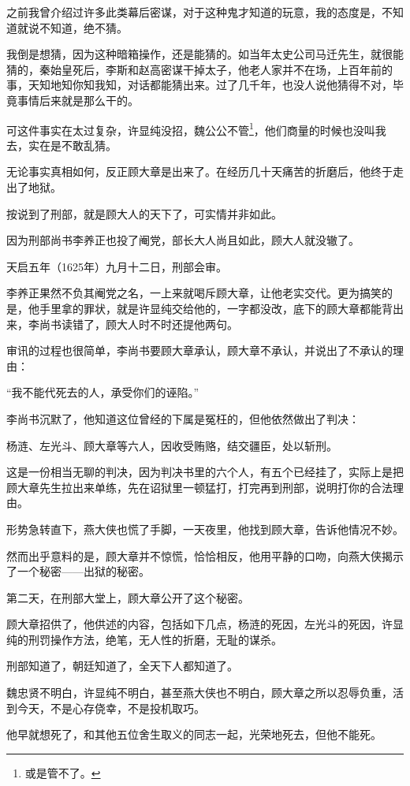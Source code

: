 \begin{multicols}{\theparacolNo}
之前我曾介绍过许多此类幕后密谋，对于这种鬼才知道的玩意，我的态度是，不知道就说不知道，绝不猜。

我倒是想猜，因为这种暗箱操作，还是能猜的。如当年太史公司马迁先生，就很能猜的，秦始皇死后，李斯和赵高密谋干掉太子，他老人家并不在场，上百年前的事，天知地知你知我知，对话都能猜出来。过了几千年，也没人说他猜得不对，毕竟事情后来就是那么干的。

可这件事实在太过复杂，许显纯没招，魏公公不管\footnote{或是管不了。}，他们商量的时候也没叫我去，实在是不敢乱猜。

无论事实真相如何，反正顾大章是出来了。在经历几十天痛苦的折磨后，他终于走出了地狱。

按说到了刑部，就是顾大人的天下了，可实情并非如此。

因为刑部尚书李养正也投了阉党，部长大人尚且如此，顾大人就没辙了。

天启五年（1625年）九月十二日，刑部会审。

李养正果然不负其阉党之名，一上来就喝斥顾大章，让他老实交代。更为搞笑的是，他手里拿的罪状，就是许显纯交给他的，一字都没改，底下的顾大章都能背出来，李尚书读错了，顾大人时不时还提他两句。

审讯的过程也很简单，李尚书要顾大章承认，顾大章不承认，并说出了不承认的理由：

“我不能代死去的人，承受你们的诬陷。”

李尚书沉默了，他知道这位曾经的下属是冤枉的，但他依然做出了判决：

杨涟、左光斗、顾大章等六人，因收受贿赂，结交疆臣，处以斩刑。

这是一份相当无聊的判决，因为判决书里的六个人，有五个已经挂了，实际上是把顾大章先生拉出来单练，先在诏狱里一顿猛打，打完再到刑部，说明打你的合法理由。

形势急转直下，燕大侠也慌了手脚，一天夜里，他找到顾大章，告诉他情况不妙。

然而出乎意料的是，顾大章并不惊慌，恰恰相反，他用平静的口吻，向燕大侠揭示了一个秘密——出狱的秘密。

第二天，在刑部大堂上，顾大章公开了这个秘密。

顾大章招供了，他供述的内容，包括如下几点，杨涟的死因，左光斗的死因，许显纯的刑罚操作方法，绝笔，无人性的折磨，无耻的谋杀。

刑部知道了，朝廷知道了，全天下人都知道了。

魏忠贤不明白，许显纯不明白，甚至燕大侠也不明白，顾大章之所以忍辱负重，活到今天，不是心存侥幸，不是投机取巧。

他早就想死了，和其他五位舍生取义的同志一起，光荣地死去，但他不能死。


\end{multicols}

